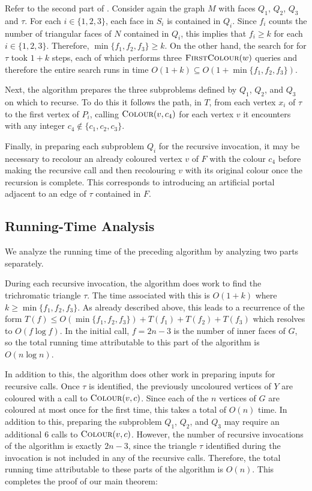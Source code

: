 \documentclass[kpfonts]{patmorin}
\let\le\leqslant
\let\ge\geqslant
\begin{document}
Refer to the second part of . Consider again the graph $M$ with faces $Q_1$, $Q_2$, $Q_3$ and $\tau$. For each $i\in\{1,2,3\}$, each face in $S_i$ is contained in $Q_i$.  Since $f_i$ counts the number of triangular faces of $N$ contained in $Q_i$, this implies that $f_i\ge k$ for each $i\in \{1,2,3\}$.  Therefore, $\min\{f_1,f_2,f_3\}\ge k$.  On the other hand, the search for for $\tau$ took $1+k$ steps, each of which performs three $\textsc{FirstColour}(w)$ queries and therefore the entire search runs in time $O(1+k) \subseteq O(1+\min\{f_1,f_2,f_3\})$.

Next, the algorithm prepares the three subproblems defined by $Q_1$, $Q_2$, and $Q_3$ on which to recurse.  To do this it follows the path, in $T$, from each vertex $x_i$ of $\tau$ to the first vertex of $P_i$, calling $\textsc{Colour}(v,c_4)$ for each vertex $v$ it encounters with any integer $c_4\not\in\{c_1,c_2,c_3\}$.

Finally, in preparing each subproblem $Q_i$ for the recursive invocation, it may be necessary to recolour an already coloured vertex $v$ of $F$ with the colour $c_4$ before making the recursive call and then recolouring $v$ with its original colour once the recursion is complete.  This corresponds to introducing an artificial portal adjacent to an edge of $\tau$ contained in $F$.

\subsection{Running-Time Analysis}

We analyze the running time of the preceding algorithm by analyzing two parts separately.

During each recursive invocation, the algorithm does work to find the trichromatic triangle $\tau$.  The time associated with this is $O(1+k)$ where $k\ge \min\{f_1,f_2,f_3\}$.  As already described above, this leads to a recurrence of the form $T(f) \le O(\min\{f_1,f_2,f_3\}) + T(f_1)+T(f_2)+T(f_3)$ which resolves to $O(f\log f)$.  In the initial call, $f=2n-3$ is the number of inner faces of $G$, so the total running time attributable to this part of the algorithm is $O(n\log n)$.

In addition to this, the algorithm does other work in preparing inputs for recursive calls.  Once $\tau$ is identified, the previously uncoloured vertices of $Y$ are coloured with a call to $\textsc{Colour}(v,c)$.  Since each of the $n$ vertices of $G$ are coloured at most once for the first time, this takes a total of $O(n)$ time.  In addition to this, preparing the subproblem $Q_1$, $Q_2$, and $Q_3$ may require an additional 6 calls to $\textsc{Colour}(v,c)$. However, the number of recursive invocations of the algorithm is exactly $2n-3$, since the triangle $\tau$ identified during the invocation is not included in any of the recursive calls.  Therefore, the total running time attributable to these parts of the algorithm is $O(n)$.  This completes the proof of our main theorem:
\end{document}
